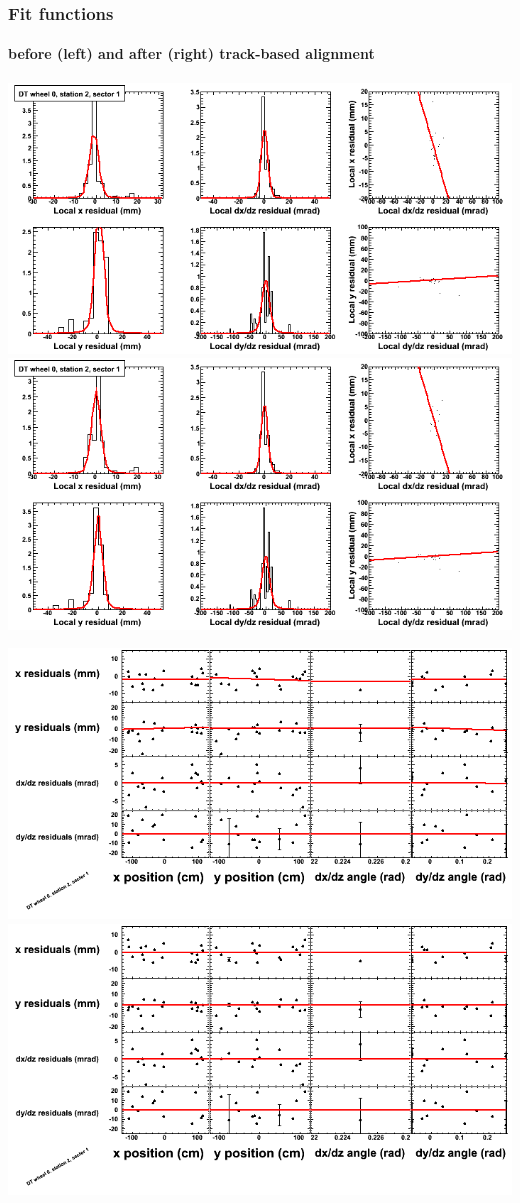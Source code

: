 \documentclass[compress]{beamer}
\begin{document}
\begin{frame}
\frametitle{Fit functions}
\framesubtitle{before (left) and after (right) track-based alignment}
\includegraphics[width=0.5\linewidth]{fitfunctions_re01/MBwhCst2sec01_bellcurves.png} \includegraphics[width=0.5\linewidth]{fitfunctions_re05/MBwhCst2sec01_bellcurves.png}

\includegraphics[width=0.5\linewidth]{fitfunctions_re01/MBwhCst2sec01_polynomials.png} \includegraphics[width=0.5\linewidth]{fitfunctions_re05/MBwhCst2sec01_polynomials.png}
\end{frame}
\end{document}
